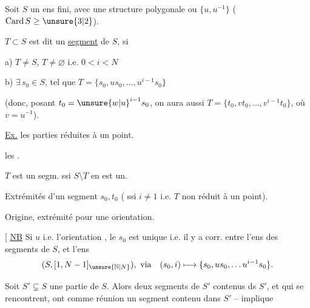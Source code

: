 Soit $S$ un ens fini, avec une structure polygonale ou  $\{u,u^{-1}\}$ ($\mathrm{Card}\,S\geq\unsure{3|2}$).

 $T\subset S$  est dit un  \uline{segment} de $S$, si

a)  $T\ne S$, $T\ne\varnothing$  i.e. $0<i<N$

b) $\exists\,s_0\in S$,  tel que $T=\{s_0,us_0,\ldots,u^{i-1}s_0\}$

(donc, posant $t_0={\unsure{w|u}}^{i-1}s_0$, on aura aussi $T=\{t_0,vt_0,\ldots,v^{i-1}t_0\}$, où $v=u^{-1}$).

\uline{Ex.} les parties réduites à un point.

les .


$T$ est un segm. ssi $S\setminus T$ en est un.



Extrémités d'un segment $s_0,t_0$ ( ssi $i\ne1$ i.e. $T$ non réduit à un point).

Origine, extrémité pour une  orientation.

[ \uline{NB} Si $u$ i.e. l'orientation , le $s_0$ est unique i.e. il y a corr.  entre l'ens des segments de $S$, et l'ens
\[
 (S,[1,N-1]_{\unsure{\mathbb N|N}}),\ \text{via}\quad (s_0,i)\longmapsto\{s_0,us_0,\ldots u^{i-1}s_0\}.
\]

Soit $S'\subsetneq S$ une partie de $S$. Alors  deux segments de $S'$ contenus ds $S'$, et qui se rencontrent, ont comme réunion un segment  contenu dans $S'$ --  implique

